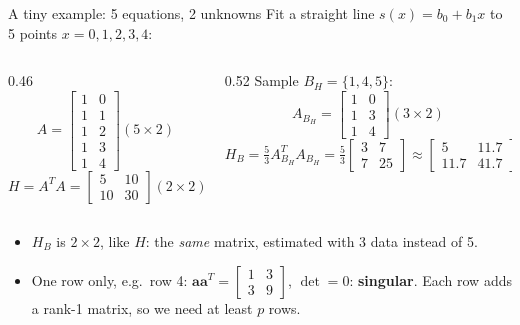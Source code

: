 \documentclass[10pt,aspectratio=169]{beamer}
\newcommand{\hl}[1]{\textcolor{accent}{\textbf{#1}}}
\begin{document}
\begin{frame}{A tiny example: 5 equations, 2 unknowns}
  Fit a straight line $s(x) = b_0 + b_1 x$ to 5 points $x = 0,1,2,3,4$:
  \begin{columns}[T]
    \begin{column}{0.46\textwidth}
      \[
        A = \begin{bmatrix} 1&0\\1&1\\1&2\\1&3\\1&4 \end{bmatrix} (5\times2)
      \]
      \[
        H = A^TA = \begin{bmatrix} 5 & 10 \\ 10 & 30 \end{bmatrix} (2\times2)
      \]
    \end{column}
    \begin{column}{0.52\textwidth}
      Sample $B_H = \{1, 4, 5\}$:
      \[
        A_{B_H} = \begin{bmatrix} 1&0\\1&3\\1&4 \end{bmatrix} (3\times2)
      \]
      \[
        H_B = \tfrac{5}{3}A_{B_H}^TA_{B_H}
            = \tfrac{5}{3}\begin{bmatrix} 3 & 7 \\ 7 & 25 \end{bmatrix}
            \approx \begin{bmatrix} 5 & 11.7 \\ 11.7 & 41.7 \end{bmatrix}
      \]
    \end{column}
  \end{columns}
  \begin{itemize}
    \item $H_B$ is $2\times2$, like $H$: the \emph{same} matrix, estimated
          with 3 data instead of 5.
    \item One row only, e.g.\ row 4: $\bm{a}\bm{a}^T =
          \left[\begin{smallmatrix} 1&3\\3&9\end{smallmatrix}\right]$,
          $\det = 0$: \hl{singular}. Each row adds a rank-1 matrix, so we need
          at least $p$ rows.
  \end{itemize}
\end{frame}
\end{document}
